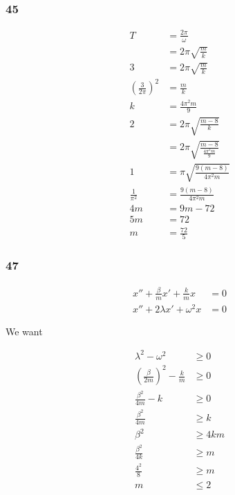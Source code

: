 \documentclass{article}
\begin{document}
\subsubsection{45}

\begin{align*}
  T                                & = \frac{2 \pi}{\omega}                           \\
                                   & = 2 \pi \sqrt{\frac{m}{k}}                       \\
  3                                & = 2 \pi \sqrt{\frac{m}{k}}                       \\
  \left( \frac{3}{2 \pi} \right)^2 & = \frac{m}{k}                                    \\
  k                                & = \frac{4 \pi^2 m}{9}                            \\
  2                                & = 2 \pi \sqrt{\frac{m - 8}{k}}                   \\
                                   & = 2 \pi \sqrt{\frac{m - 8}{\frac{4 \pi^2 m}{9}}} \\
  1                                & = \pi \sqrt{\frac{9 (m - 8)}{4 \pi^2 m}}         \\
  \frac{1}{\pi^2}                  & = \frac{9 (m - 8)}{4 \pi^2 m}                    \\
  4 m                              & = 9 m - 72                                       \\
  5 m                              & = 72                                             \\
  m                                & = \frac{72}{5}
\end{align*}

\subsubsection{47}

\begin{align*}
  x'' + \frac{\beta}{m} x' + \frac{k}{m} x & = 0 \\
  x'' + 2 \lambda x' + \omega^2 x          & = 0
\end{align*}

We want

\begin{align*}
  \lambda^2 - \omega^2                             & \ge 0     \\
  \left( \frac{\beta}{2 m} \right)^2 - \frac{k}{m} & \ge 0     \\
  \frac{\beta^2}{4 m} - k                          & \ge 0     \\
  \frac{\beta^2}{4 m}                              & \ge k     \\
  \beta^2                                          & \ge 4 k m \\
  \frac{\beta^2}{4 k}                              & \ge m     \\
  \frac{4^2}{8}                                    & \ge m     \\
  m                                                & \le 2
\end{align*}
\end{document}
